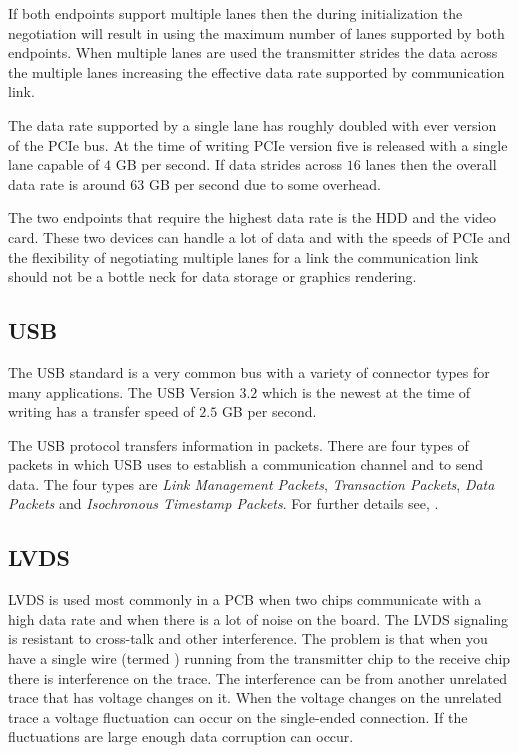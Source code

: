 If both endpoints support multiple lanes then the during initialization the negotiation will result in using the maximum number of lanes supported by both endpoints. When multiple lanes are used the transmitter strides the data across the multiple lanes increasing the effective data rate supported by communication link.

The data rate supported by a single lane has roughly doubled with ever version of the \ac{PCIe} bus. At the time of writing \ac{PCIe} version five is released with a single lane capable of $4$ \ac{GB} per second. If data strides across $16$ lanes then the overall data rate is around $63$ \ac{GB} per second due to some overhead.

The two endpoints that require the highest data rate is the \ac{HDD} and the video card. These two devices can handle a lot of data and with the speeds of \ac{PCIe} and the flexibility of negotiating multiple lanes for a link the communication link should not be a bottle neck for data storage or graphics rendering.
	
\subsection{USB}

The \ac{USB} standard is a very common bus with a variety of connector types for many applications. The \ac{USB} Version $3.2$ which is the newest at the time of writing has a transfer speed of $2.5$ \ac{GB} per second. \cite{usbref}

The \ac{USB} protocol transfers information in packets. There are four types of packets in which \ac{USB} uses to establish a communication channel and to send data. The four types are \emph{Link Management Packets}, \emph{Transaction Packets}, \emph{Data Packets} and \emph{Isochronous Timestamp Packets}. For further details see, \cite{usbproto}.	
	
\subsection{LVDS}  
	
\ac{LVDS} is used most commonly in a \ac{PCB} when two chips communicate with a high data rate and when there is a lot of noise on the board. The \ac{LVDS} signaling is resistant to cross-talk and other interference. The problem is that when you have a single wire (termed ) running from the transmitter chip to the receive chip there is interference on the trace. The interference can be from another unrelated trace that has voltage changes on it. When the voltage changes on the unrelated trace a voltage fluctuation can occur on the single-ended connection. If the fluctuations are large enough data corruption can occur.

